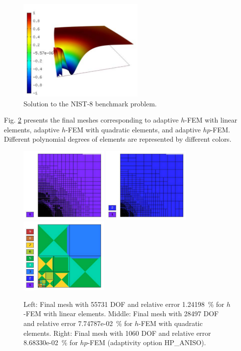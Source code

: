 \documentclass[12pt]{elsarticle}
\begin{document}
\begin{figure}[H]
\centering
\vspace{-3mm}
\includegraphics[height=5cm]{mafig47.pdf}
\caption{Solution to the NIST-8 benchmark problem.}
\label{fig:sln-nist08}
\end{figure}

Fig. \ref{fig:nist-8-hp-aniso} presents the final meshes corresponding to adaptive $h$-FEM with
linear elements, adaptive $h$-FEM with quadratic elements, and adaptive $hp$-FEM. Different
polynomial degrees of elements are represented by different colors.

\begin{figure}[H]
\centering
\includegraphics[height=3.7cm]{mafig48.pdf}
\includegraphics[height=3.7cm]{mafig49.pdf}
\includegraphics[height=3.7cm]{mafig50.pdf}
\caption{
Left: Final mesh with 55731 DOF and relative error 1.24198~\% for $h$-FEM with linear elements.
Middle: Final mesh with 28497 DOF and relative error 7.74787e-02~\% for $h$-FEM with quadratic elements.
Right: Final mesh with 1060 DOF and relative error 8.68330e-02~\% for $hp$-FEM (adaptivity option HP\_ANISO).}
\label{fig:nist-8-hp-aniso}
\end{figure}
\end{document}
